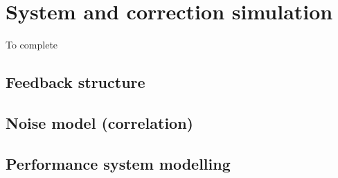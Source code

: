 \section{System and correction simulation}

To complete

\subsection{Feedback structure}
\subsection{Noise model (correlation)} 
\subsection{Performance system modelling} 


